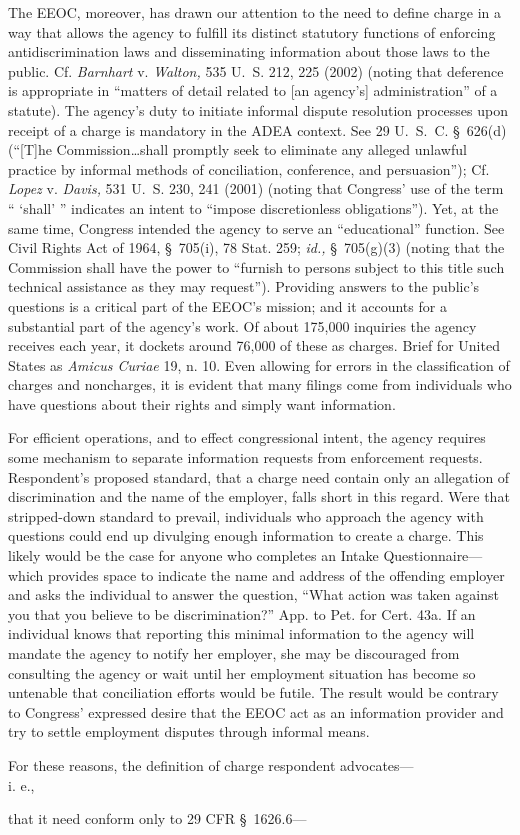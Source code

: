 {  The EEOC, moreover, has drawn our attention to the need to define
charge in a way that allows the agency to fulfill its distinct statutory
functions of enforcing antidiscrimination laws and disseminating
information about those laws to the public. Cf. \emph{Barnhart} v.
\emph{Walton,} 535 U.~S. 212, 225 (2002) (noting that deference is
appropriate in ``matters of detail related to [an agency's]
administration'' of a statute). The agency's duty to initiate
informal dispute resolution processes upon receipt of a charge is
mandatory in the ADEA context. See 29 U.~S.~C. \S~626(d) (``[T]he
Commission\dots shall promptly seek to eliminate any alleged
unlawful practice by informal methods of conciliation, conference, and
persuasion''); Cf. \emph{Lopez} v. \emph{Davis,} 531 U.~S. 230, 241 (2001)
(noting that Congress' use of the term `` ‘shall' '' indicates
an intent to ``impose discretionless obligations''). Yet, at the
same time, Congress intended the agency to serve an ``educational''
function. See Civil Rights Act of 1964, \S~705(i), 78 Stat. 259;
\newpage  \emph{id.,} \S~705(g)(3) (noting that the Commission shall
have the power to ``furnish to persons subject to this title such
technical assistance as they may request''). Providing answers to the
public's questions is a critical part of the EEOC's mission; and it
accounts for a substantial part of the agency's work. Of about 175,000
inquiries the agency receives each year, it dockets around 76,000 of
these as charges. Brief for United States as \emph{Amicus Curiae} 19,
n. 10. Even allowing for errors in the classification of charges and
noncharges, it is evident that many filings come from individuals who
have questions about their rights and simply want information.

  For efficient operations, and to effect congressional intent, the
agency requires some mechanism to separate information requests from
enforcement requests. Respondent's proposed standard, that a charge
need contain only an allegation of discrimination and the name of the
employer, falls short in this regard. Were that stripped-down standard
to prevail, individuals who approach the agency with questions could end
up divulging enough information to create a charge. This likely would
be the case for anyone who completes an Intake Questionnaire---which
provides space to indicate the name and address of the offending
employer and asks the individual to answer the question, ``What action
was taken against you that you believe to be discrimination?'' App.
to Pet. for Cert. 43a. If an individual knows that reporting this
minimal information to the agency will mandate the agency to notify her
employer, she may be discouraged from consulting the agency or wait
until her employment situation has become so untenable that conciliation
efforts would be futile. The result would be contrary to Congress'
expressed desire that the EEOC act as an information provider and try to
settle employment disputes through informal means.

  For these reasons, the definition of charge respondent
advocates---\\i. e.,} that it need conform only to 29 CFR \S~1626.6---
